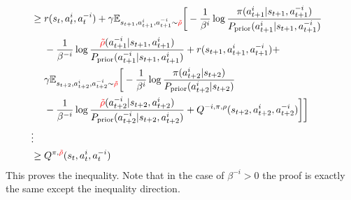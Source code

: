 \begin{equation*}
\begin{aligned}
\begin{aligned}[t]
    \end{aligned} \\ 
    &\ge \begin{aligned}[t]
        &r(s_t, a^i_t, a^{-i}_t) + \gamma \mathbb{E}_{s_{t+1}, a^i_{t+1}, a^{-i}_{t+1} \sim {\color{red} \tilde{\rho}}} \bigg[ - \frac{1}{\beta^{i}}\log \frac{\pi(a^i_{t+1} | s_{t+1}, a^{-i}_{t+1})}{P_{\text{prior}}(a^i_{t+1} | s_{t+1}, a^{-i}_{t+1}) } \\
        & - \frac{1}{\beta^{-i}}\log \frac{{\color{red} \tilde{\rho}}(a^{-i}_{t+1} | s_{t+1}, a^i_{t+1})}{P_{\text{prior}}(a^{-i}_{t+1} | s_{t+1}, a^i_{t+1})}  +  r(s_{t+1}, a^i_{t+1}, a^{-i}_{t+1}) + \\
        &\gamma \mathbb{E}_{s_{t+2}, a^i_{t+2}, a^{-i}_{t+2} \sim {\color{red} \tilde{\rho}}} \bigg[ - \frac{1}{\beta^{i}}\log \frac{\pi(a^i_{t+2} | s_{t+2})}{P_{\text{prior}}(a^i_{t+2} | s_{t+2}) } \\
        & - \frac{1}{\beta^{-i}}\log \frac{{\color{red} \tilde{\rho}}(a^{-i}_{t+2} | s_{t+2}, a^i_{t+2})}{P_{\text{prior}}(a^{-i}_{t+2} | s_{t+2}, a^i_{t+2})}  + Q^{-i, \pi, \rho}(s_{t+2}, a^i_{t+2}, a^{-i}_{t+2}) \bigg]\bigg]
    \end{aligned} \\ 
    &\vdots \\
    & \ge Q^{\pi, {\color{red} \tilde{\rho}}}(s_t, a^i_t, a^{-i}_t)
\end{aligned}
\end{equation*}
This proves the inequality. Note that in the case of $\beta^{-i} > 0$ the proof is exactly the same except the inequality direction.